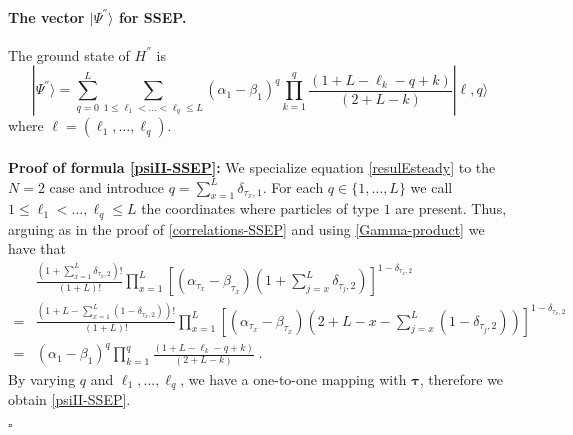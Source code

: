 \documentclass[10pt]{article}
\numberwithin{equation}{section}
\numberwithin{equation}{subsection}
\newcommand{\dt}{\;.}
\begin{document}
{\paragraph{The vector $|\Psi^{''}\rangle$ for SSEP.} The ground state of $H^{''}$ is 
\begin{equation}\label{psiII-SSEP}
	|\Psi^{''}\rangle=\sum_{q=0}^{L}\sum_{1\leq \ell_{1}<\ldots<\ell_{q}\leq L}(\alpha_{1}-\beta_{1})^{q}\prod_{k=1}^{q}\frac{\left(1+L-\ell_{k}-q+k\right)}{(2+L-k)}|\bm{\ell},q\rangle
\end{equation}
where $\bm{\ell}=(\ell_{1},\ldots,\ell_{q})$. \\ \\
\textbf{Proof of formula \eqref{psiII-SSEP}:} We specialize equation \eqref{resulEsteady} to the {$N=2$ case} and introduce $q=\sum_{x=1}^{L}\delta_{\tau_{x},1}$. For each $q\in \{1,\ldots,L\}$ we call $1\leq\ell_{1}<\ldots,\ell_{q}\leq L$ the coordinates where particles of type $1$ are present. Thus, arguing as in the proof of \eqref{correlations-SSEP} and using \eqref{Gamma-product} we have that 
\begin{align}
	&\frac{\left(1+\sum_{x=1}^{L}\delta_{\tau_{x},2}\right)!}{\left(1+L\right)!}\prod_{x=1}^{L}\left[(\alpha_{\tau_{x}}-\beta_{\tau_{x}})\left(1+\sum_{j=x}^{L}\delta_{\tau_{j},2}\right)\right]^{1-\delta_{\tau_{x},2}}\nonumber\\
	=&\frac{\left(1+L-\sum_{x=1}^{L}(1-\delta_{\tau_{x},2})\right)!}{\left(1+L\right)!}\prod_{x=1}^{L}\left[(\alpha_{\tau_{x}}-\beta_{\tau_{x}})\left(2+L-x-\sum_{j=x}^{L}(1-\delta_{\tau_{j},2})\right)\right]^{1-\delta_{\tau_{x},2}}\nonumber\\
	=&(\alpha_{1}-\beta_{1})^{q}\prod_{k=1}^{q}\frac{\left(1+L-\ell_{k}-q+k\right)}{(2+L-k)}\dt
\end{align}
By varying $q$ and $\ell_{1},\ldots,\ell_{q}$, we have a one-to-one mapping with $\bm{\tau}$, therefore we obtain \eqref{psiII-SSEP}.
\begin{flushright}
	$\square$
\end{flushright}
}
\end{document}
